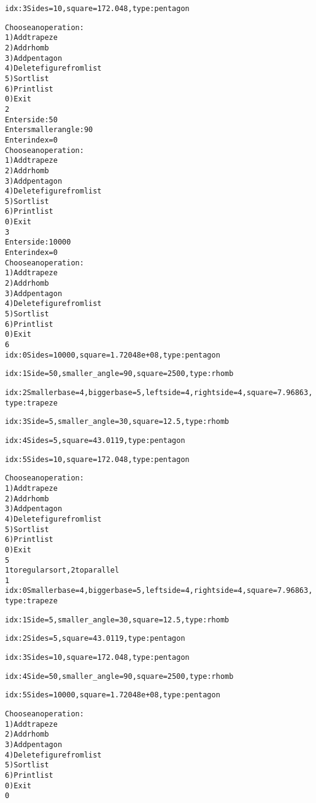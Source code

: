\begin{alltt}
idx: 3   Sides =  10, square = 172.048, type: pentagon

Choose an operation:
1) Add trapeze
2) Add rhomb
3) Add pentagon
4) Delete figure from list
5) Sort list
6) Print list
0) Exit
2
Enter side: 50
Enter smaller angle: 90
Enter index = 0
Choose an operation:
1) Add trapeze
2) Add rhomb
3) Add pentagon
4) Delete figure from list
5) Sort list
6) Print list
0) Exit
3
Enter side: 10000
Enter index = 0
Choose an operation:
1) Add trapeze
2) Add rhomb
3) Add pentagon
4) Delete figure from list
5) Sort list
6) Print list
0) Exit
6
idx: 0   Sides =  10000, square = 1.72048e+08, type: pentagon

idx: 1   Side = 50, smaller_angle = 90, square = 2500, type: rhomb

idx: 2   Smaller base = 4, bigger base = 5, left side = 4, right side = 4, square = 7.96863, type: trapeze

idx: 3   Side = 5, smaller_angle = 30, square = 12.5, type: rhomb

idx: 4   Sides =  5, square = 43.0119, type: pentagon

idx: 5   Sides =  10, square = 172.048, type: pentagon

Choose an operation:
1) Add trapeze
2) Add rhomb
3) Add pentagon
4) Delete figure from list
5) Sort list
6) Print list
0) Exit
5
1 to regular sort, 2 to parallel
1
idx: 0   Smaller base = 4, bigger base = 5, left side = 4, right side = 4, square = 7.96863, type: trapeze

idx: 1   Side = 5, smaller_angle = 30, square = 12.5, type: rhomb

idx: 2   Sides =  5, square = 43.0119, type: pentagon

idx: 3   Sides =  10, square = 172.048, type: pentagon

idx: 4   Side = 50, smaller_angle = 90, square = 2500, type: rhomb

idx: 5   Sides =  10000, square = 1.72048e+08, type: pentagon


Choose an operation:
1) Add trapeze
2) Add rhomb
3) Add pentagon
4) Delete figure from list
5) Sort list
6) Print list
0) Exit
0

\end{alltt}

